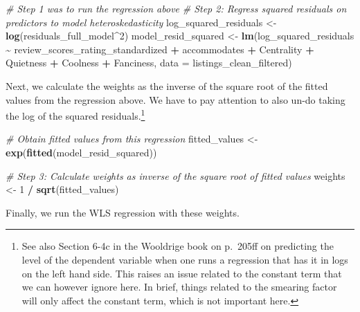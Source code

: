 \documentclass[
]{article}
\newenvironment{Shaded}{\begin{snugshade}}{\end{snugshade}}
\newcommand{\AttributeTok}[1]{\textcolor[rgb]{0.13,0.29,0.53}{#1}}
\newcommand{\CommentTok}[1]{\textcolor[rgb]{0.56,0.35,0.01}{\textit{#1}}}
\newcommand{\DecValTok}[1]{\textcolor[rgb]{0.00,0.00,0.81}{#1}}
\newcommand{\FunctionTok}[1]{\textcolor[rgb]{0.13,0.29,0.53}{\textbf{#1}}}
\newcommand{\NormalTok}[1]{#1}
\newcommand{\OtherTok}[1]{\textcolor[rgb]{0.56,0.35,0.01}{#1}}
\newcommand{\SpecialCharTok}[1]{\textcolor[rgb]{0.81,0.36,0.00}{\textbf{#1}}}
\begin{document}
\begin{Shaded}
\begin{Highlighting}[]
\CommentTok{\# Step 1 was to run the regression above}
\CommentTok{\# Step 2: Regress squared residuals on predictors to model heteroskedasticity}
\NormalTok{log\_squared\_residuals }\OtherTok{\textless{}{-}} \FunctionTok{log}\NormalTok{(residuals\_full\_model}\SpecialCharTok{\^{}}\DecValTok{2}\NormalTok{)}
\NormalTok{model\_resid\_squared }\OtherTok{\textless{}{-}} \FunctionTok{lm}\NormalTok{(log\_squared\_residuals }\SpecialCharTok{\textasciitilde{}}\NormalTok{ review\_scores\_rating\_standardized }\SpecialCharTok{+}\NormalTok{ accommodates }
                          \SpecialCharTok{+}\NormalTok{ Centrality }\SpecialCharTok{+}\NormalTok{ Quietness }\SpecialCharTok{+}\NormalTok{ Coolness }\SpecialCharTok{+}\NormalTok{ Fanciness, }\AttributeTok{data =}\NormalTok{ listings\_clean\_filtered)}
\end{Highlighting}
\end{Shaded}

Next, we calculate the weights as the inverse of the square root of the
fitted values from the regression above. We have to pay attention to
also un-do taking the log of the squared residuals.\footnote{See also
  Section 6-4c in the Wooldrige book on p.~205ff on predicting the level
  of the dependent variable when one runs a regression that has it in
  logs on the left hand side. This raises an issue related to the
  constant term that we can however ignore here. In brief, things
  related to the smearing factor will only affect the constant term,
  which is not important here.}

\begin{Shaded}
\begin{Highlighting}[]
\CommentTok{\# Obtain fitted values from this regression}
\NormalTok{fitted\_values }\OtherTok{\textless{}{-}} \FunctionTok{exp}\NormalTok{(}\FunctionTok{fitted}\NormalTok{(model\_resid\_squared))}

\CommentTok{\# Step 3: Calculate weights as inverse of the square root of fitted values}
\NormalTok{weights }\OtherTok{\textless{}{-}} \DecValTok{1} \SpecialCharTok{/} \FunctionTok{sqrt}\NormalTok{(fitted\_values)}
\end{Highlighting}
\end{Shaded}

Finally, we run the WLS regression with these weights.
\end{document}
